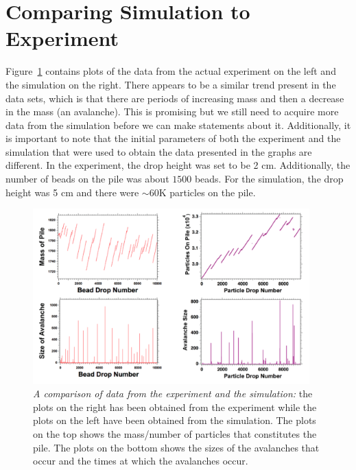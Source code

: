 \documentclass{book}
\begin{document}
\section{Comparing Simulation to Experiment}
Figure~\ref{fig:comparingData} contains plots of the data from the actual experiment on the left and the simulation on the right. There appears to be a similar trend present in the data sets, which is that there are periods of increasing mass and then a decrease in the mass (an avalanche). This is promising but we still need to acquire more data from the simulation before we can make statements about it.  Additionally, it is important to note that the initial parameters of both the experiment and the simulation that were used to obtain the data presented in the graphs are different. In the experiment, the drop height was set to be 2 cm. Additionally, the number of beads on the pile was about $1500$ beads. For the simulation, the drop height was 5 cm and there were $\sim60$K particles on the pile. 
\begin{figure}[h]
	\centering
	\includegraphics[width=0.95\textwidth]{Figures/Results/comparingData/origComparision}
	\caption[Comparing experiment and simuation data]{\textit{A comparison of data from the experiment and the simulation:} the plots on the right has been obtained from the experiment while the plots on the left have been obtained from the simulation. The plots on the top shows the mass/number of particles that constitutes the pile. The plots on the bottom shows the sizes of the avalanches that occur and the times at which the avalanches occur.}
	\label{fig:comparingData}
\end{figure}
\end{document}
